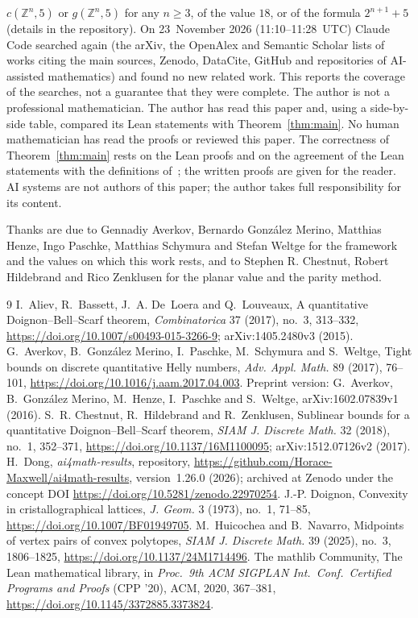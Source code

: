 \documentclass[11pt]{article}
\theoremstyle{definition}
\theoremstyle{remark}
\newcommand{\repoversion}{1.26.0}
\newcommand{\Z}{\mathbb Z}
\begin{document}
$c(\Z^n,5)$ or $g(\Z^n,5)$ for any $n\ge3$, of the value $18$, or of the
formula $2^{n+1}+5$ (details in the repository). On 23~November 2026 (11:10--11:28~UTC) Claude Code searched again (the arXiv, the OpenAlex and Semantic Scholar lists of works citing the main sources, Zenodo, DataCite, GitHub and repositories of AI-assisted mathematics) and found no new related work. This
reports the coverage of the searches, not a guarantee that they were complete.
The author is not a professional mathematician. The author has read this paper and, using a side-by-side table, compared its Lean statements with Theorem~\ref{thm:main}. No human
mathematician has read the proofs or reviewed this paper. The correctness of
Theorem~\ref{thm:main} rests on the Lean proofs and on the agreement of the
Lean statements with the definitions of~\cite{agm}; the written proofs are given
for the reader. AI systems are not authors of this paper; the author takes full
responsibility for its content.

\medskip
\noindent Thanks are due to Gennadiy Averkov, Bernardo Gonz\'alez Merino,
Matthias Henze, Ingo Paschke, Matthias Schymura and Stefan Weltge for the
framework and the values on which this work rests, and to Stephen R. Chestnut,
Robert Hildebrand and Rico Zenklusen for the planar value and the parity
method.

{\small
\begin{thebibliography}{9}
\setlength{\itemsep}{1pt}
 I.~Aliev, R.~Bassett, J.~A. De~Loera and Q.~Louveaux, A
quantitative Doignon--Bell--Scarf theorem, \emph{Combinatorica} 37 (2017),
no.~3, 313--332, \url{https://doi.org/10.1007/s00493-015-3266-9};
arXiv:1405.2480v3 (2015).
 G.~Averkov, B.~Gonz\'alez Merino, I.~Paschke, M.~Schymura and
S.~Weltge, Tight bounds on discrete quantitative Helly numbers, \emph{Adv.
Appl. Math.} 89 (2017), 76--101,
\url{https://doi.org/10.1016/j.aam.2017.04.003}. Preprint version:
G.~Averkov, B.~Gonz\'alez Merino, M.~Henze, I.~Paschke and S.~Weltge,
arXiv:1602.07839v1 (2016).
 S.~R. Chestnut, R.~Hildebrand and R.~Zenklusen, Sublinear bounds
for a quantitative Doignon--Bell--Scarf theorem, \emph{SIAM J. Discrete Math.}
32 (2018), no.~1, 352--371, \url{https://doi.org/10.1137/16M1100095};
arXiv:1512.07126v2 (2017).
 H.~Dong, \emph{ai4math-results}, repository,
\url{https://github.com/Horace-Maxwell/ai4math-results}, version~\repoversion{}
(2026); archived at Zenodo under the concept DOI
\url{https://doi.org/10.5281/zenodo.22970254}.
 J.-P. Doignon, Convexity in cristallographical lattices,
\emph{J. Geom.} 3 (1973), no.~1, 71--85,
\url{https://doi.org/10.1007/BF01949705}.
 M.~Huicochea and B.~Navarro, Midpoints of vertex pairs of convex
polytopes, \emph{SIAM J. Discrete Math.} 39 (2025), no.~3, 1806--1825,
\url{https://doi.org/10.1137/24M1714496}.
The mathlib Community, The Lean mathematical library, in \emph{Proc.\ 9th ACM
SIGPLAN Int.\ Conf.\ Certified Programs and Proofs} (CPP '20), ACM, 2020,
367--381, \url{https://doi.org/10.1145/3372885.3373824}.
\end{thebibliography}}
\end{document}
